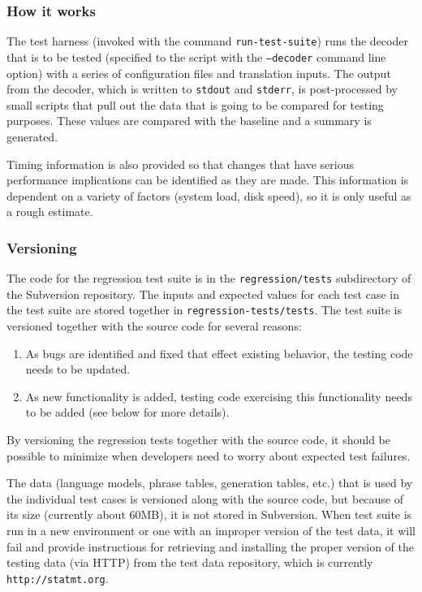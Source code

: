 \documentclass[11pt]{report}
\theoremstyle{plain}
\begin{document}
{\subsubsection{How it works}
The test harness (invoked with the command \texttt{run-test-suite})
runs the decoder that is to be tested (specified to the script with
the \texttt{--decoder} command line option) with a series of
configuration files and translation inputs.  The output from the
decoder, which is written to \texttt{stdout} and \texttt{stderr}, is
post-processed by small scripts that pull out the data that is going
to be compared for testing purposes.  These values are compared with
the baseline and a summary is generated.

Timing information is also provided so that changes that have
serious performance implications can be identified as they are made.
This information is dependent on a variety of factors (system load,
disk speed), so it is only useful as a rough estimate.

\subsubsection{Versioning}
The code for the regression test suite is in the
\texttt{regression/tests} subdirectory of the Subversion repository.
 The inputs and expected values for each test case in the test suite are stored
together in \texttt{regression-tests/tests}.  The test suite is
versioned together with the source code for several reasons:
\begin{enumerate}
  \item As bugs are identified and fixed that effect existing behavior, the
testing code needs to be updated.
  \item As new functionality is added, testing code exercising this functionality needs to be
  added (see below for more details).
\end{enumerate}
By versioning the regression tests together with the source code, it
should be possible to minimize when developers need to worry about
expected test failures.

The data (language models, phrase tables, generation tables, etc.)
that is used by the individual test cases is versioned along with
the source code, but because of its size (currently about 60MB), it
is not stored in Subversion.  When test suite is run in a new
environment or one with an improper version of the test data, it
will fail and provide instructions for retrieving and installing the
proper version of the testing data (via HTTP) from the test data
repository, which is currently \texttt{http://statmt.org}.

}
\end{document}
